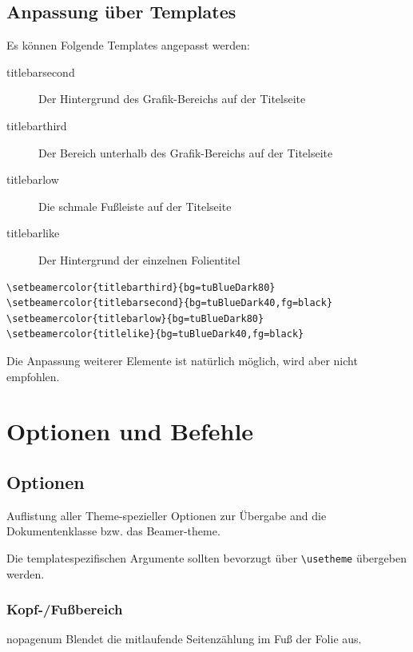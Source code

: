 \documentclass[cmyk,a4paper,colorscheme=green,TUBStitlepage=picture]{tubsreprt}
\begin{document}
\section{Anpassung über Templates}

Es können Folgende Templates angepasst werden:
\begin{description}
  \item[\color{tuRed100}\ttfamily titlebarsecond]
    Der Hintergrund des Grafik-Bereichs auf der Titelseite
  \item[\color{tuRed100}\ttfamily titlebarthird]
    Der Bereich unterhalb des Grafik-Bereichs auf der Titelseite
  \item[\color{tuRed100}\ttfamily titlebarlow]
    Die schmale Fußleiste auf der Titelseite
  \item[\color{tuRed100}\ttfamily titlebarlike]
    Der Hintergrund der einzelnen Folientitel
\end{description}

\example

\begin{lstlisting}
\setbeamercolor{titlebarthird}{bg=tuBlueDark80}
\setbeamercolor{titlebarsecond}{bg=tuBlueDark40,fg=black}
\setbeamercolor{titlebarlow}{bg=tuBlueDark80}
\setbeamercolor{titlelike}{bg=tuBlueDark40,fg=black}
\end{lstlisting}

Die Anpassung weiterer Elemente ist natürlich möglich,
wird aber nicht empfohlen.

\chapter{Optionen und Befehle}

\section{Optionen}\label{optionen}

Auflistung aller Theme-spezieller Optionen zur Übergabe and die
Dokumentenklasse bzw. das Beamer-theme.

Die templatespezifischen Argumente sollten bevorzugt
über \lstinline!\usetheme! übergeben werden.

\subsection{Kopf-/Fußbereich}

\begin{classoption}{nopagenum}
  Blendet die mitlaufende Seitenzählung im Fuß der Folie aus.
\end{classoption}
\end{document}
